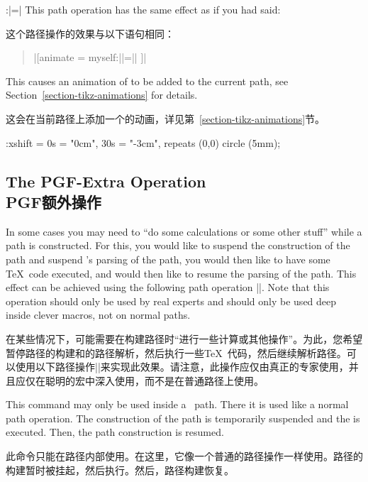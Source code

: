 \begin{pathoperation}{:}{|=|}
    This path operation has the same effect as if you had said:
    
    这个路径操作的效果与以下语句相同：

    \begin{quote}
        |[animate = { myself:||=||} ]|
    \end{quote}
    This causes an animation of  to be added to the
    current path, see Section~\ref{section-tikz-animations} for details.
    
    这会在当前路径上添加一个的动画，详见第~\ref{section-tikz-animations}节。
\begin{codeexample}[width=2cm,preamble={\usetikzlibrary{animations}}]
\tikz \draw :xshift = {0s = "0cm", 30s = "-3cm", repeats} (0,0) circle (5mm);
\end{codeexample}
\end{pathoperation}


\subsection{The PGF-Extra Operation\\PGF额外操作}

In some cases you may need to ``do some calculations or some other stuff''
while a path is constructed. For this, you would like to suspend the
construction of the path and suspend \tikzname's parsing of the path, you would
then like to have some \TeX\ code executed, and would then like to resume the
parsing of the path. This effect can be achieved using the following path
operation |\pgfextra|. Note that this operation should only be used by real
experts and should only be used deep inside clever macros, not on normal paths.

在某些情况下，可能需要在构建路径时“进行一些计算或其他操作”。为此，您希望暂停路径的构建和\tikzname 的路径解析，然后执行一些\TeX\ 代码，然后继续解析路径。可以使用以下路径操作|\pgfextra|来实现此效果。请注意，此操作应仅由真正的专家使用，并且应仅在聪明的宏中深入使用，而不是在普通路径上使用。

\begin{command}{\pgfextra{}}
    This command may only be used inside a \tikzname\ path. There it is used
    like a normal path operation. The construction of the path is temporarily
    suspended and the  is executed. Then, the path construction is
    resumed.

    此命令只能在\tikzname 路径内部使用。在这里，它像一个普通的路径操作一样使用。路径的构建暂时被挂起，然后执行。然后，路径构建恢复。

\begin{codeexample}[]
\newdimen\mydim
\begin{tikzpicture}
  \mydim=1cm
  \draw (0pt,\mydim) \pgfextra{\mydim=2cm} -- (0pt,\mydim);
\end{tikzpicture}
\end{codeexample}
\end{command}

